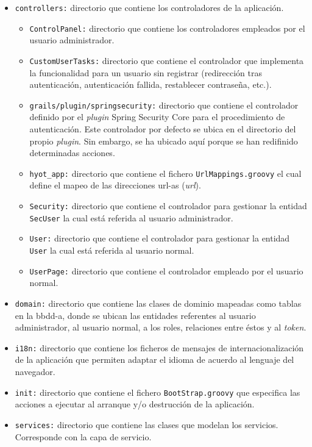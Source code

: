 \documentclass[12pt,a4paper, twoside]{report}
\begin{document}
\begin{itemize}
\begin{itemize}
\begin{itemize}
		    	\item \texttt{controllers:} directorio que contiene los controladores de la aplicación.
		    	
		    	\begin{itemize}
					\item \texttt{ControlPanel:} directorio que contiene los controladores empleados por el usuario administrador.
					\item \texttt{CustomUserTasks:} directorio que contiene el controlador que implementa la funcionalidad para un usuario sin registrar (redirección tras autenticación, autenticación fallida, restablecer contraseña, etc.).
					\item \texttt{grails/plugin/springsecurity:} directorio que contiene el controlador definido por el \textit{\gls{plugin}} Spring Security Core para el procedimiento de autenticación. Este controlador por defecto se ubica en el directorio del propio \textit{\gls{plugin}}. Sin embargo, se ha ubicado aquí porque se han redifinido determinadas acciones.
					\item \texttt{hyot\_app:} directorio que contiene el fichero \texttt{UrlMappings.groovy} el cual define el mapeo de las direcciones \glspl{url-a} (\textit{\gls{url}}).	
					\item \texttt{Security:} directorio que contiene el controlador para gestionar la entidad \texttt{SecUser} la cual está referida al usuario administrador.	
					\item \texttt{User:} directorio que contiene el controlador para gestionar la entidad \texttt{User} la cual está referida al usuario normal.	
					\item \texttt{UserPage:} directorio que contiene el controlador empleado por el usuario normal.
				\end{itemize}
		    	
				\item \texttt{domain:} directorio que contiene las clases de dominio mapeadas como tablas en la \gls{bbdd-a}, donde se ubican las entidades referentes al usuario administrador, al usuario normal, a los roles, relaciones entre éstos y al \textit{\gls{token}}.
				\item \texttt{i18n:} directorio que contiene los ficheros de mensajes de internacionalización de la aplicación que permiten adaptar el idioma de acuerdo al lenguaje del navegador.
				\item \texttt{init:} directorio que contiene el fichero \texttt{BootStrap.groovy} que especifica las acciones a ejecutar al arranque y/o destrucción de la aplicación.
				\item \texttt{services:} directorio que contiene las clases que modelan los servicios. Corresponde con la capa de servicio.
				

\end{itemize}
\end{itemize}
\end{itemize}
\end{document}
